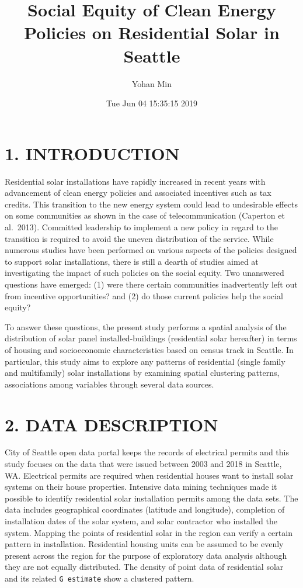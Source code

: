 \documentclass[11pt,]{article}
\title{Social Equity of Clean Energy Policies on Residential Solar in Seattle}
\author{Yohan Min}
\date{Tue Jun 04 15:35:15 2019}
\begin{document}
\maketitle

\fontsize{11}{16}
\selectfont

\hypertarget{introduction}{%
\section{1. INTRODUCTION}\label{introduction}}

Residential solar installations have rapidly increased in recent years
with advancement of clean energy policies and associated incentives such
as tax credits. This transition to the new energy system could lead to
undesirable effects on some communities as shown in the case of
telecommunication (Caperton et al.~2013). Committed leadership to
implement a new policy in regard to the transition is required to avoid
the uneven distribution of the service. While numerous studies have been
performed on various aspects of the policies designed to support solar
installations, there is still a dearth of studies aimed at investigating
the impact of such policies on the social equity. Two unanswered
questions have emerged: (1) were there certain communities inadvertently
left out from incentive opportunities? and (2) do those current policies
help the social equity?

To answer these questions, the present study performs a spatial analysis
of the distribution of solar panel installed-buildings (residential
solar hereafter) in terms of housing and socioeconomic characteristics
based on census track in Seattle. In particular, this study aims to
explore any patterns of residential (single family and multifamily)
solar installations by examining spatial clustering patterns,
associations among variables through several data sources.

\hypertarget{data-description}{%
\section{2. DATA DESCRIPTION}\label{data-description}}

City of Seattle open data portal keeps the records of electrical permits
and this study focuses on the data that were issued between 2003 and
2018 in Seattle, WA. Electrical permits are required when residential
houses want to install solar systems on their house properties.
Intensive data mining techniques made it possible to identify
residential solar installation permits among the data sets. The data
includes geographical coordinates (latitude and longitude), completion
of installation dates of the solar system, and solar contractor who
installed the system. Mapping the points of residential solar in the
region can verify a certain pattern in installation. Residential housing
units can be assumed to be evenly present across the region for the
purpose of exploratory data analysis although they are not equally
distributed. The density of point data of residential solar and its
related \texttt{G\ estimate} show a clustered pattern.
\end{document}
